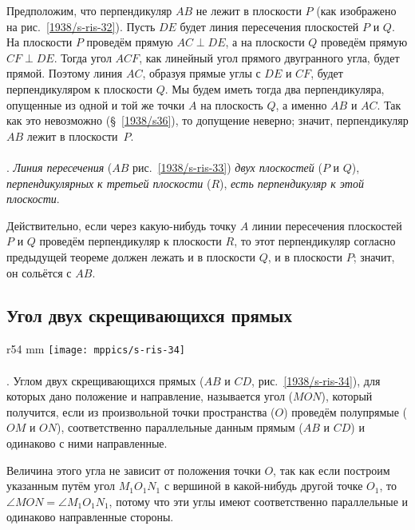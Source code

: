 Предположим, что перпендикуляр $AB$ не лежит в плоскости $P$ (как изображено на рис.~\ref{1938/s-ris-32}).
Пусть $DE$ будет линия пересечения плоскостей $P$ и $Q$.
На плоскости $P$ проведём прямую $AC \perp DE$, а на плоскости $Q$ проведём прямую $CF \perp DE$.
Тогда угол $ACF$, как линейный угол прямого двугранного угла, будет прямой.
Поэтому линия $AC$, образуя прямые углы с $DE$ и $CF$, будет перпендикуляром к плоскости $Q$.
Мы будем иметь тогда два перпендикуляра, опущенные из одной и той же точки $A$ на плоскость $Q$, а именно $AB$ и $AC$.
Так как это невозможно (§~\ref{1938/s36}), то допущение неверно;
значит, перпендикуляр $AB$ лежит в плоскости~$P$.


\paragraph{}\label{1938/s45}
\mbox{.}
\emph{Линия пересечения} ($AB$ рис.~\ref{1938/s-ris-33}) \emph{двух плоскостей} ($P$ и $Q$), \emph{перпендикулярных к третьей плоскости} ($R$), \emph{есть перпендикуляр к этой плоскости}.

Действительно, если через какую-нибудь точку $A$ линии пересечения плоскостей $P$ и $Q$ проведём перпендикуляр к плоскости $R$, то этот перпендикуляр согласно предыдущей теореме должен лежать и в плоскости $Q$, и в плоскости $P$; значит, он сольётся с $AB$.



\subsection*{Угол двух скрещивающихся прямых}

\begin{wrapfigure}{r}{54 mm}
\vskip-4mm
\centering
\texttt{[image: mppics/s-ris-34]}
\caption{}\label{1938/s-ris-34}
\end{wrapfigure}

\paragraph{}\label{1938/s46}
\mbox{.}
Углом двух скрещивающихся прямых ($AB$ и $CD$, рис.~\ref{1938/s-ris-34}), для которых дано положение и направление, называется угол ($MON$), который получится, если из произвольной точки пространства ($O$) проведём полупрямые ($OM$ и $ON$), соответственно параллельные данным прямым ($AB$ и $CD$) и одинаково с ними направленные.

Величина этого угла не зависит от положения точки $O$, так как если построим указанным путём угол $M_1O_1N_1$ с вершиной в какой-нибудь другой точке $O_1$, то $\angle MON = \angle M_1O_1N_1$, потому что эти углы имеют соответственно параллельные и одинаково направленные стороны.

